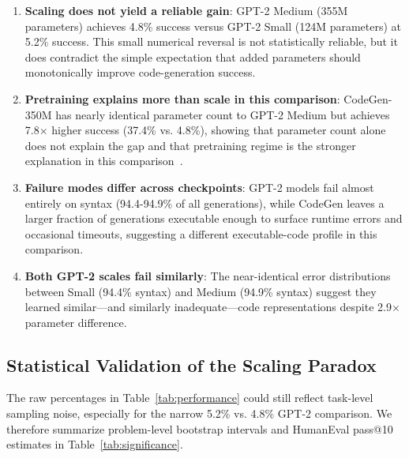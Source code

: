 \documentclass[preprint,12pt,authoryear]{elsarticle}
\begin{document}
\begin{enumerate}
\item \textbf{Scaling does not yield a reliable gain}: GPT-2 Medium (355M parameters) achieves 4.8\% success versus GPT-2 Small (124M parameters) at 5.2\% success. This small numerical reversal is not statistically reliable, but it does contradict the simple expectation that added parameters should monotonically improve code-generation success.

\item \textbf{Pretraining explains more than scale in this comparison}: CodeGen-350M has nearly identical parameter count to GPT-2 Medium but achieves 7.8$\times$ higher success (37.4\% vs. 4.8\%), showing that parameter count alone does not explain the gap and that pretraining regime is the stronger explanation in this comparison~\cite{nijkamp2022codegen}.

\item \textbf{Failure modes differ across checkpoints}: GPT-2 models fail almost entirely on syntax (94.4-94.9\% of all generations), while CodeGen leaves a larger fraction of generations executable enough to surface runtime errors and occasional timeouts, suggesting a different executable-code profile in this comparison.

\item \textbf{Both GPT-2 scales fail similarly}: The near-identical error distributions between Small (94.4\% syntax) and Medium (94.9\% syntax) suggest they learned similar---and similarly inadequate---code representations despite 2.9$\times$ parameter difference.
\end{enumerate}

\subsection{Statistical Validation of the Scaling Paradox}

The raw percentages in Table~\ref{tab:performance} could still reflect task-level sampling noise, especially for the narrow 5.2\% vs. 4.8\% GPT-2 comparison. We therefore summarize problem-level bootstrap intervals and HumanEval pass@10 estimates in Table~\ref{tab:significance}.

\begin{table}[t]
\centering
\caption{Problem-Level Statistical Validation}
\label{tab:significance}
\scriptsize
{}
\end{table}
\end{document}
